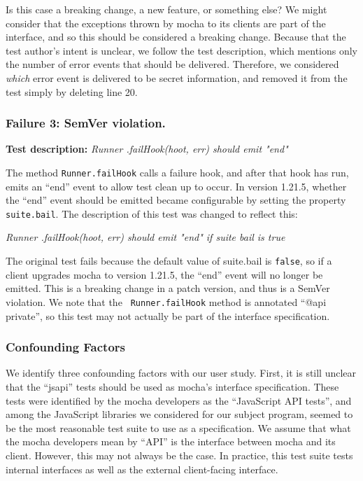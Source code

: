 Is this case a breaking change, a new feature, or something else?
We might consider that the exceptions thrown by mocha to its clients
are part of the interface, and so this should be considered a breaking
change. Because that the test author's intent is unclear, we follow the
test description, which mentions only the number of error events that
should be delivered. Therefore, we considered {\em which} error event
is delivered to be secret information, and removed it from the test
simply by deleting line 20.

\subsubsection{Failure 3: SemVer violation.}
\label{sec:failure3}
{\bf Test description:}
%
{\em Runner .failHook(hoot, err) should emit "end" }

The method {\tt Runner.failHook} calls a failure hook, and after that
hook has run, emits an ``end'' event to allow test clean up to occur. In
version 1.21.5, whether the ``end'' event should be emitted became
configurable by setting the property {\tt suite.bail}. The
description of this test was changed to reflect this:

{\em Runner .failHook(hoot, err) should emit "end" if suite bail is
  true }

The original test fails because the default value of suite.bail is
{\tt false}, so if a client upgrades mocha to version 1.21.5, the
``end'' event will no longer be emitted. This is a breaking change in
a patch version, and thus is a SemVer violation. We note that the {\tt
  Runner.failHook} method is annotated ``@api private'', so this test
may not actually be part of the interface specification.

\subsubsection{Confounding Factors}
We identify three confounding factors with our user study. First, it
is still unclear that the ``jsapi'' tests should be used as mocha's
interface specification. These tests were identified by the mocha
developers as the ``JavaScript API tests'', and among the JavaScript
libraries we considered for our subject program, seemed to be the most
reasonable test suite to use as a specification. We assume that what
the mocha developers mean by ``API'' is the interface between mocha and
its client. However, this may not always be the case. In practice, this
test suite tests internal interfaces as well as the external
client-facing interface.

